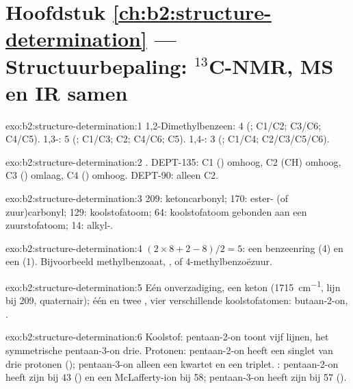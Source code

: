 \section*{Hoofdstuk \ref{ch:b2:structure-determination} --- Structuurbepaling: \texorpdfstring{$^{13}$C}{13C}-NMR, MS en IR samen}

\begin{solution}{exo:b2:structure-determination:1}
1,2-Dimethylbenzeen: 4 (; C1/C2; C3/C6; C4/C5). 1,3-: 5 (; C1/C3; C2; C4/C6; C5).
1,4-: 3 (; C1/C4; C2/C3/C5/C6).
\end{solution}

\begin{solution}{exo:b2:structure-determination:2}
. DEPT-135: C1 () omhoog, C2 (CH) omhoog, C3 () omlaag, C4 () omhoog.
DEPT-90: alleen C2.
\end{solution}

\begin{solution}{exo:b2:structure-determination:3}
209: ketoncarbonyl; 170: ester- (of zuur)carbonyl; 129:  koolstofatoom; 64: koolstofatoom gebonden aan een
zuurstofatoom; 14: alkyl-.
\end{solution}

\begin{solution}{exo:b2:structure-determination:4}
$(2 \times 8 + 2 - 8)/2 = 5$: een benzeenring (4) en een  (1). Bijvoorbeeld methylbenzoaat,
, of 4-methylbenzoëzuur.
\end{solution}

\begin{solution}{exo:b2:structure-determination:5}
Eén onverzadiging, een keton (\qty{1715}{cm^{-1}}, lijn bij 209, quaternair); één  en twee
, vier verschillende koolstofatomen: butaan-2-on, .
\end{solution}

\begin{solution}{exo:b2:structure-determination:6}
Koolstof: pentaan-2-on toont vijf lijnen, het symmetrische pentaan-3-on drie. Protonen: pentaan-2-on heeft een
singlet van drie protonen (); pentaan-3-on alleen een kwartet en een triplet. : pentaan-2-on
heeft zijn  bij 43 () en een McLafferty-ion bij 58; pentaan-3-on heeft zijn  bij 57
().
\end{solution}

